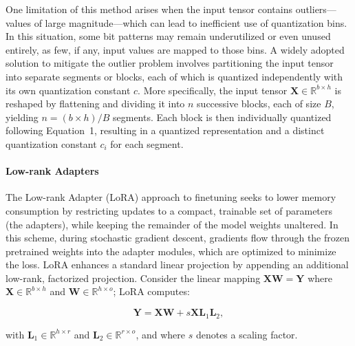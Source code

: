 One limitation of this method arises when the input tensor contains outliers—values of large magnitude—which can lead to inefficient use of quantization bins. In this situation, some bit patterns may remain underutilized or even unused entirely, as few, if any, input values are mapped to those bins. A widely adopted solution to mitigate the outlier problem involves partitioning the input tensor into separate segments or blocks, each of which is quantized independently with its own quantization constant $c$. More specifically, the input tensor $\mathbf{X}\in \mathbb{R}^{b\times h}$ is reshaped by flattening and dividing it into $n$ successive blocks, each of size $B$, yielding ${n = ({b\times h} )/{B} }$ segments. Each block is then individually quantized following Equation~1, resulting in a quantized representation and a distinct quantization constant $c_i$ for each segment.

\paragraph{Low-rank Adapters} The Low-rank Adapter (LoRA) approach to finetuning \citep{hu2021lora} seeks to lower memory consumption by restricting updates to a compact, trainable set of parameters (the adapters), while keeping the remainder of the model weights unaltered. In this scheme, during stochastic gradient descent, gradients flow through the frozen pretrained weights into the adapter modules, which are optimized to minimize the loss. LoRA enhances a standard linear projection by appending an additional low-rank, factorized projection. Consider the linear mapping ${\mathbf{X} \mathbf{W} = \mathbf{Y}}$ where $\mathbf{X}\in  \mathbb{R}^{b\times h}$ and $\mathbf{W}\in  \mathbb{R}^{h\times o}$; LoRA computes:

\begin{equation}
    \mathbf{Y} = \mathbf{X}\mathbf{W} + s\mathbf{X}\mathbf{L}_1\mathbf{L}_2,
\end{equation}

with $\mathbf{L}_1\in  \mathbb{R}^{h\times r}$ and $\mathbf{L}_2\in  \mathbb{R}^{r\times o}$, and where $s$ denotes a scaling factor.

